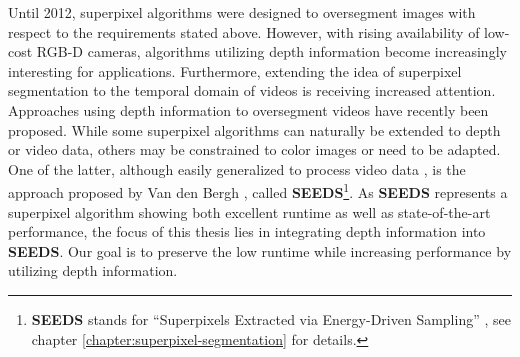 Until 2012, superpixel algorithms were designed to oversegment images with respect to the requirements stated above. However, with rising availability of low-cost RGB-D cameras, algorithms utilizing depth information become increasingly interesting for applications. Furthermore, extending the idea of superpixel segmentation to the temporal domain of videos is receiving increased attention. Approaches using depth information to oversegment videos \cite{WeikersdorferSchickCremers:2013} have recently been proposed. While some superpixel algorithms can naturally be extended to depth or video data, others may be constrained to color images or need to be adapted. One of the latter, although easily generalized to process video data \cite{VanDenBerghRoigBoixManenVanGool:2013}, is the approach proposed by Van den Bergh \etal \cite{VanDenBerghBoixRoigCapitaniVanGool:2012}, called \textbf{SEEDS}\footnote{\textbf{SEEDS} stands for ``Superpixels Extracted via Energy-Driven Sampling'' \cite{VanDenBerghBoixRoigCapitaniVanGool:2012}, see chapter \ref{chapter:superpixel-segmentation} for details.}. As \textbf{SEEDS} represents a superpixel algorithm showing both excellent runtime as well as state-of-the-art performance, the focus of this thesis lies in integrating depth information into \textbf{SEEDS}. Our goal is to preserve the low runtime while increasing performance by utilizing depth information.


